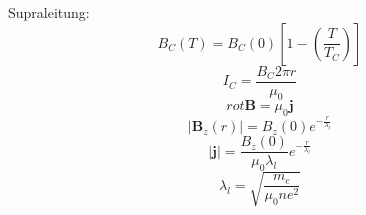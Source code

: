 \documentclass[11pt]{article}
\begin{document}
Supraleitung:
\begin{equation}
  B_C(T)=B_C(0)\left[1-\left(\frac{T}{T_C}\right)\right]
\end{equation}
\begin{equation}
  I_C=\frac{B_C2\pi r}{\mu_0}
\end{equation}
\begin{equation}
  rot\bm{B}=\mu_0\bm{j}
\end{equation}
\begin{equation}
  \left|\bm{B}_z(r)\right|=B_z(0)e^{-\frac{r}{\lambda_l}}
\end{equation}
\begin{equation}
  \left|\bm{j}\right|=\frac{B_z(0)}{\mu_0\lambda_l}e^{-\frac{r}{\lambda_l}}
\end{equation}
\begin{equation}
  \lambda_l = \sqrt{\frac{m_e}{\mu_0ne^2}}
\end{equation}
\end{document}
